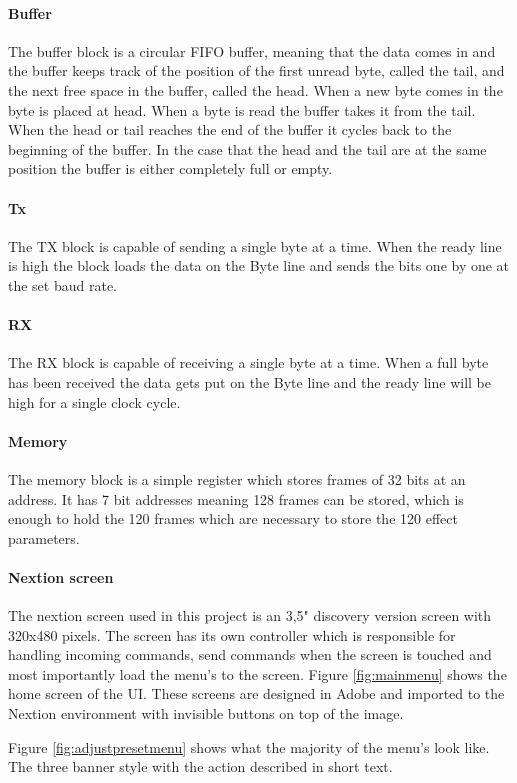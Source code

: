\paragraph{Buffer}
The buffer block is a circular FIFO buffer, meaning that the data comes in and the buffer keeps track of the position of the first unread byte, called the tail, and the next free space in the buffer, called the head. When a new byte comes in the byte is placed at head. When a byte is read the buffer takes it from the tail. When the head or tail reaches the end of the buffer it cycles back to the beginning of the buffer. In the case that the head and the tail are at the same position the buffer is either completely full or empty.

\paragraph{Tx}
The TX block is capable of sending a single byte at a time. When the ready line is high the block loads the data on the Byte line and sends the bits one by one at the set baud rate.

\paragraph{RX}
The RX block is capable of receiving a single byte at a time. When a full byte has been received the data gets put on the Byte line and the ready line will be high for a single clock cycle.

\paragraph{Memory}
The memory block is a simple register which stores frames of 32 bits at an address. It has 7 bit addresses meaning 128 frames can be stored, which is enough to hold the 120 frames which are necessary to store the 120 effect parameters.

\paragraph{Nextion screen}
The nextion screen used in this project is an 3,5" discovery version screen with 320x480 pixels. The screen has its own controller which is responsible for handling incoming commands, send commands when the screen is touched and most importantly load the menu's to the screen. Figure \ref{fig:mainmenu} shows the home screen of the UI. These screens are designed in Adobe and imported to the Nextion environment with invisible buttons on top of the image.

Figure \ref{fig:adjustpresetmenu} shows what the majority of the menu's look like. The three banner style with the action described in short text.